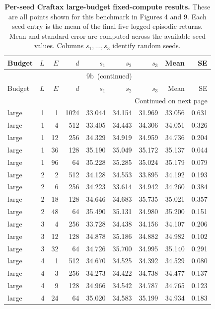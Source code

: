 {\scriptsize
\setlength{\tabcolsep}{3.0pt}
\renewcommand{\thetable}{9b}
\begin{longtable}{@{}lrrrrrrrr@{}}
\caption{\textbf{Per-seed Craftax large-budget fixed-compute results.} These are all points shown for this benchmark in Figures 4 and 9. Each seed entry is the mean of the final five logged episodic returns. Mean and standard error are computed across the available seed values. Columns \(s_1,\ldots,s_3\) identify random seeds.}\label{tab:appendix-craftax-large-fixed-compute-seeds}\\
\toprule
Budget & \(L\) & \(E\) & \(d\) & \(s_1\) & \(s_2\) & \(s_3\) & Mean & SE \\
\midrule
\endfirsthead
\multicolumn{9}{c}{\tablename~\thetable\ (continued)} \\
\toprule
Budget & \(L\) & \(E\) & \(d\) & \(s_1\) & \(s_2\) & \(s_3\) & Mean & SE \\
\midrule
\endhead
\midrule
\multicolumn{9}{r}{Continued on next page} \\
\endfoot
\bottomrule
\endlastfoot
large & 1 & 1 & 1024 & 33.044 & 34.154 & 31.969 & 33.056 & 0.631 \\
large & 1 & 4 & 512 & 33.405 & 34.443 & 34.306 & 34.051 & 0.326 \\
large & 1 & 12 & 256 & 34.329 & 34.919 & 34.959 & 34.736 & 0.204 \\
large & 1 & 36 & 128 & 35.190 & 35.049 & 35.172 & 35.137 & 0.044 \\
large & 1 & 96 & 64 & 35.228 & 35.285 & 35.024 & 35.179 & 0.079 \\
large & 2 & 2 & 512 & 34.128 & 34.553 & 33.895 & 34.192 & 0.193 \\
large & 2 & 6 & 256 & 34.223 & 33.614 & 34.942 & 34.260 & 0.384 \\
large & 2 & 18 & 128 & 34.646 & 34.683 & 35.735 & 35.021 & 0.357 \\
large & 2 & 48 & 64 & 35.490 & 35.131 & 34.980 & 35.200 & 0.151 \\
large & 3 & 4 & 256 & 33.728 & 34.438 & 34.156 & 34.107 & 0.206 \\
large & 3 & 12 & 128 & 34.878 & 35.186 & 34.882 & 34.982 & 0.102 \\
large & 3 & 32 & 64 & 34.726 & 35.700 & 34.995 & 35.140 & 0.291 \\
large & 4 & 1 & 512 & 34.670 & 34.525 & 34.392 & 34.529 & 0.080 \\
large & 4 & 3 & 256 & 34.273 & 34.422 & 34.738 & 34.477 & 0.137 \\
large & 4 & 9 & 128 & 34.966 & 34.542 & 34.787 & 34.765 & 0.123 \\
large & 4 & 24 & 64 & 35.020 & 34.583 & 35.199 & 34.934 & 0.183 \\
\end{longtable}
}
